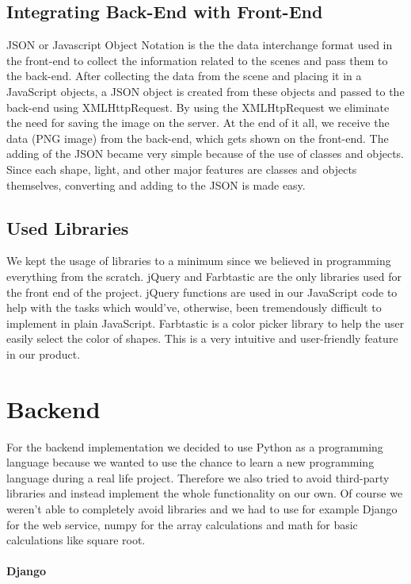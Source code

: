 \documentclass[10pt]{scrartcl}
\begin{document}
\subsection{Integrating Back-End with Front-End}
JSON or Javascript Object Notation is the the data interchange format used in the front-end to collect the information related to the scenes and pass them to the back-end. After collecting the data from the scene and placing it in a JavaScript objects, a JSON object is created from these objects and passed to the back-end using XMLHttpRequest. By using the XMLHtpRequest we eliminate the need for saving the image on the server. At the end of it all, we receive the data (PNG image) from the back-end, which gets shown on the front-end. The adding of the JSON became very simple because of the use of classes and objects. Since each shape, light, and other major features are classes and objects themselves, converting and adding to the JSON is made easy. 

\subsection{Used Libraries}

We kept the usage of libraries to a minimum since we believed in programming everything from the scratch. jQuery and Farbtastic are the only libraries used for the front end of the project. jQuery functions are used in our JavaScript code to help with the tasks which would've, otherwise, been tremendously difficult to implement in plain JavaScript. Farbtastic is a color picker library to help the user easily select the color of shapes. This is a very intuitive and user-friendly feature in our product.

\section{Backend}

For the backend implementation we decided to use Python as a programming language because we wanted to use the chance to learn a new programming language during a real life project. Therefore we also tried to avoid third-party libraries and instead implement the whole functionality on our own. Of course we weren't able to completely avoid libraries and we had to use for example Django for the web service, numpy for the array calculations and math for basic calculations like square root.

\paragraph{Django}
\end{document}
